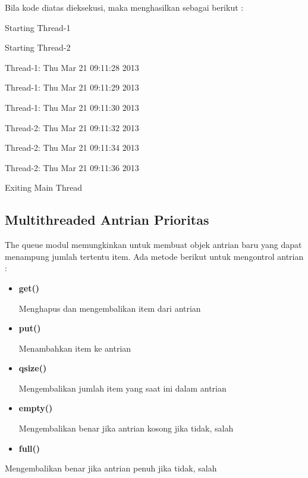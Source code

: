 \vspace{8pt}
Bila kode diatas dieksekusi, maka menghasilkan sebagai berikut : \par
{\fontsize{10pt}{10pt}\selectfont Starting Thread-1} \par
\noindent 
{\fontsize{10pt}{10pt}\selectfont Starting Thread-2} \par
\noindent 
{\fontsize{10pt}{10pt}\selectfont Thread-1: Thu Mar 21 09:11:28 2013} \par
\noindent 
{\fontsize{10pt}{10pt}\selectfont Thread-1: Thu Mar 21 09:11:29 2013} \par
\noindent 
{\fontsize{10pt}{10pt}\selectfont Thread-1: Thu Mar 21 09:11:30 2013} \par
\noindent 
{\fontsize{10pt}{10pt}\selectfont Thread-2: Thu Mar 21 09:11:32 2013} \par
\noindent 
{\fontsize{10pt}{10pt}\selectfont Thread-2: Thu Mar 21 09:11:34 2013} \par
\noindent 
{\fontsize{10pt}{10pt}\selectfont Thread-2: Thu Mar 21 09:11:36 2013} \par
\noindent 
{\fontsize{10pt}{10pt}\selectfont Exiting Main Thread} \par

\vspace{8pt}
\subsection{Multithreaded Antrian Prioritas} \par
\hspace*{0.5in} The queue modul memungkinkan untuk membuat objek antrian baru yang dapat menampung jumlah tertentu item. Ada metode berikut untuk mengontrol antrian : \par
\vspace{15pt}
\begin{itemize}
	\item \textbf{get()} \par
		Menghapus dan mengembalikan item dari antrian
	\par
	\item \textbf{put()} \par
		Menambahkan item ke antrian
	\par
	\item \textbf{qsize()} \par
		Mengembalikan jumlah item yang saat ini dalam antrian
	\par
	\item \textbf{empty()} \par
		Mengembalikan benar jika antrian kosong jika tidak, salah
	\par
	\item \textbf{full()}\end{itemize}
\par
	Mengembalikan benar jika antrian penuh jika tidak, salah

